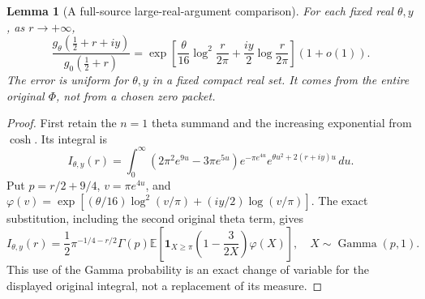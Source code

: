 \documentclass[11pt,a4paper]{article}
\newtheorem{lemma}[theorem]{Lemma}
\theoremstyle{definition}\newtheorem{definition}[theorem]{Definition}
\begin{document}
\begin{lemma}[A full-source large-real-argument comparison]
For each fixed real $\theta,y$, as $r\to+\infty$,
\begin{equation}
 \frac{g_\theta(\frac12+r+iy)}{g_0(\frac12+r)}
 =\exp\left[\frac{\theta}{16}\log^2\frac{r}{2\pi}
                +\frac{iy}{2}\log\frac{r}{2\pi}\right](1+o(1)).
                                                               \tag{AR1}\label{AR1}
\end{equation}
The error is uniform for $\theta,y$ in a fixed compact real set. It comes from the entire original $\Phi$, not from a chosen zero packet.
\end{lemma}
\begin{proof}
First retain the $n=1$ theta summand and the increasing exponential from $\cosh$. Its integral is
\[
 I_{\theta,y}(r)=\int_0^\infty
 (2\pi^2e^{9u}-3\pi e^{5u})e^{-\pi e^{4u}}
 e^{\theta u^2+2(r+iy)u}\,du.
\]
Put $p=r/2+9/4$, $v=\pi e^{4u}$, and
$\varphi(v)=\exp[(\theta/16)\log^2(v/\pi)+(iy/2)\log(v/\pi)]$.
The exact substitution, including the second original theta term, gives
\begin{equation}
 I_{\theta,y}(r)=\frac12\pi^{-1/4-r/2}\Gamma(p)
 \mathbb E\left[\mathbf1_{X\ge\pi}
             \left(1-\frac3{2X}\right)\varphi(X)\right],
 \quad X\sim\operatorname{Gamma}(p,1).                       \tag{AR2}\label{AR2}
\end{equation}
This use of the Gamma probability is an exact change of variable for the displayed original integral, not a replacement of its measure.


\end{proof}
\end{document}
